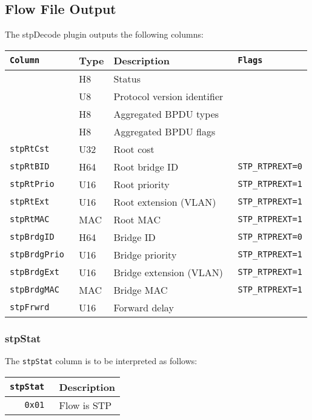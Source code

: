 \documentclass[documentation]{subfiles}
\begin{document}
\subsection{Flow File Output}
The stpDecode plugin outputs the following columns:
\begin{longtable}{>{\tt}lll>{\tt\small}l}
    \toprule
    {\bf Column} & {\bf Type} & {\bf Description} & {\bf Flags}\\
    \midrule\endhead%
    \nameref{stpStat}    & H8  & Status                      & \\
    \nameref{stpVer}     & U8  & Protocol version identifier & \\
    \nameref{stpType}    & H8  & Aggregated BPDU types       & \\
    \nameref{stpFlags}   & H8  & Aggregated BPDU flags       & \\
    stpRtCst             & U32 & Root cost                   & \\
    stpRtBID             & H64 & Root bridge ID              & STP\_RTPREXT=0\\
    stpRtPrio            & U16 & Root priority               & STP\_RTPREXT=1\\
    stpRtExt             & U16 & Root extension (VLAN)       & STP\_RTPREXT=1\\
    stpRtMAC             & MAC & Root MAC                    & STP\_RTPREXT=1\\
    stpBrdgID            & H64 & Bridge ID                   & STP\_RTPREXT=0\\
    stpBrdgPrio          & U16 & Bridge priority             & STP\_RTPREXT=1\\
    stpBrdgExt           & U16 & Bridge extension (VLAN)     & STP\_RTPREXT=1\\
    stpBrdgMAC           & MAC & Bridge MAC                  & STP\_RTPREXT=1\\
    stpFrwrd             & U16 & Forward delay               & \\
    \bottomrule
\end{longtable}


\subsubsection{stpStat}\label{stpStat}
The {\tt stpStat} column is to be interpreted as follows:
\begin{longtable}{>{\tt}rl}
    \toprule
    {\bf stpStat} & {\bf Description}\\
    \midrule\endhead%
    0x01 & Flow is STP\\
    \bottomrule
\end{longtable}
\end{document}
